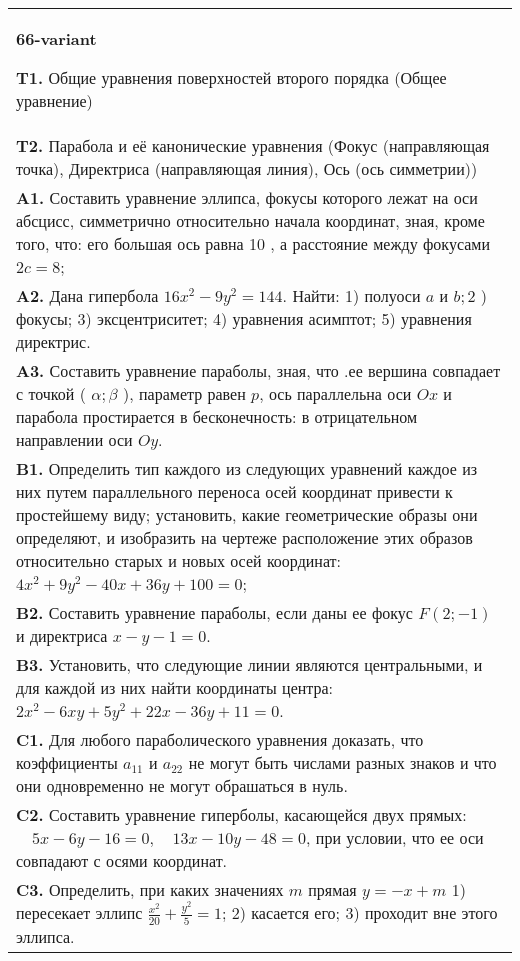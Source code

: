 \documentclass{article}
\begin{document}
\begin{tabular}{m{17cm}}
\textbf{66-variant}
\newline

\textbf{T1.} Общие уравнения поверхностей второго порядка (Общее уравнение) \\
\textbf{T2.} Парабола и её канонические уравнения (Фокус (направляющая точка), Директриса (направляющая линия), Ось (ось симметрии)) \\
\textbf{A1.} Составить уравнение эллипса, фокусы которого лежат на оси абсцисс, симметрично относительно начала координат, зная, кроме того, что: его большая ось равна 10 , а расстояние между фокусами $2 c=8$; \\
\textbf{A2.} Дана гипербола $16 x^2-9 y^2=144$. Найти: 1) полуоси $a$ и $b ; 2$ ) фокусы; 3) эксцентриситет; 4) уравнения асимптот; 5) уравнения директрис. \\
\textbf{A3.} Составить уравнение параболы, зная, что .ее вершина совпадает с точкой ( $\alpha ; \beta$ ), параметр равен $p$, ось параллельна оси $O x$ и парабола простирается в бесконечность: в отрицательном направлении оси $O y$. \\
\textbf{B1.} Определить тип каждого из следующих уравнений каждое из них путем параллельного переноса осей координат привести к простейшему виду; установить, какие геометрические образы они определяют, и изобразить на чертеже расположение этих образов относительно старых и новых осей координат: $4 x^2+9 y^2-40 x+36 y+100=0$; \\
\textbf{B2.} Составить уравнение параболы, если даны ее фокус $F(2 ;-1)$ и директриса $x-y-1=0$. \\
\textbf{B3.} Установить, что следующие линии являются центральными, и для каждой из них найти координаты центра: $2 x^2-6 x y+5 y^2+22 x-36 y+11=0$. \\
\textbf{C1.} Для любого параболического уравнения доказать, что коэффициенты $a_{11}$ и $a_{22}$ не могут быть числами разных знаков и что они одновременно не могут обрашаться в нуль. \\
\textbf{C2.} Составить уравнение гиперболы, касающейся двух прямых: $\quad 5 x-6 y-16=0, \quad 13 x-10 y-48=0$, при условии, что ее оси совпадают с осями координат. \\
\textbf{C3.} Определить, при каких значениях $m$ прямая $y=-x+m$ 1) пересекает эллипс $\frac{x^2}{20}+\frac{y^2}{5}=1$; 2) касается его; 3) проходит вне этого эллипса. \\

\end{tabular}
\vspace{1cm}
\end{document}
